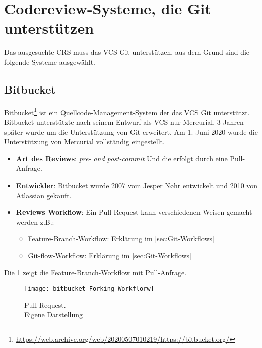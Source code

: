 \section{Codereview-Systeme, die Git unterstützen}
\label{sec:CRS-Git}

Das ausgesuchte \ac{CRS} muss das \ac{VCS} Git unterstützen, aus dem Grund sind die folgende Systeme ausgewählt.

\subsection{Bitbucket}
\label{subsec:Bitbucket}

Bitbucket\footnote{\url{https://web.archive.org/web/20200507010219/https://bitbucket.org/}} ist ein Quellcode-Management-System der das \ac{VCS} Git unterstützt. Bitbucket unterstützte nach seinem Entwurf als \ac{VCS} nur Mercurial. 3 Jahren später wurde um die Unterstützung von Git erweitert. Am 1. Juni 2020 wurde die Unterstützung von Mercurial vollständig eingestellt.

\begin{itemize}
	\item \textbf{Art des Reviews}: \textit{pre- and post-commit} Und die erfolgt durch eine Pull-Anfrage.
	\item \textbf{Entwickler}: Bitbucket wurde 2007 vom Jesper Nøhr entwickelt und 2010 von Atlassian
		 gekauft. 
	\item \textbf{Reviews Workflow}: Ein Pull-Request kann verschiedenen Weisen gemacht werden z.B.:
		\begin{itemize}
			\item Feature-Branch-Workflow: Erklärung im \cref{sec:Git-Workflows}
			\item Git-flow-Workflow: Erklärung im \cref{sec:Git-Workflows}
		\end{itemize}
\end{itemize}

Die \cref{fig:Forking-workflow} zeigt die Feature-Branch-Workflow mit Pull-Anfrage.

\begin{figure}[H]
	\centering
	\texttt{[image: bitbucket\_Forking-Workflorw]}
	\caption[Feature-Branch-Workflow]{Pull-Request.\\Eigene Darstellung}
	\label{fig:Forking-workflow}
\end{figure}

